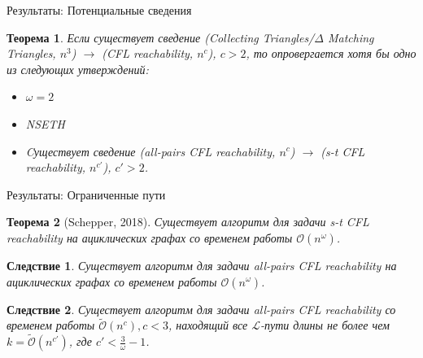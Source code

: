 \documentclass{beamer}
\newtheorem{cor}{Следствие}
\newtheorem{theor}{Теорема}
\begin{document}
	
\begin{frame}{Результаты: Потенциальные сведения}
	\begin{theor}
		Если существует сведение (Collecting Triangles/$\Delta$ Matching Triangles, $n^3$) $\rightarrow$ (CFL reachability, $n^c$), $c > 2$, то опровергается хотя бы одно из следующих утверждений:
		
		\begin{itemize}
			\item $\omega = 2$
			\item NSETH
			\item Cуществует сведение (all-pairs CFL reachability, $n^c$) $\rightarrow$ (s-t CFL reachability, $n^{c′} $), $c′ > 2$.
		\end{itemize}
	\end{theor}
\end{frame}


\begin{frame}{Результаты: Ограниченные пути}
	\begin{theor}[Schepper, 2018]
		Существует алгоритм для задачи s-t CFL reachability на ациклических графах со временем работы $\mathcal{O}(n^{\omega})$.
	\end{theor}

	\begin{cor}
		Существует алгоритм для задачи all-pairs CFL reachability на ациклических графах со временем работы $\mathcal{O}(n^{\omega})$.
	\end{cor}

	\begin{cor}
		Существует алгоритм для задачи all-pairs CFL reachability со временем работы $\tilde{\mathcal{O}}(n^c), c < 3$, находящий все $\mathcal{L}$-пути длины не более чем $k = \tilde{\mathcal{O}}(n^{c'})$, где $c' < \frac{3}{\omega} - 1$.
	\end{cor}
\end{frame}
\end{document}
